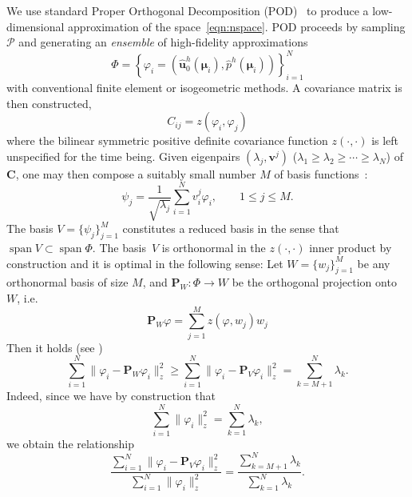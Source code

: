 \documentclass[onecolumn, twoside, a4paper, 11pt]{article}
\begin{document}
We use standard Proper Orthogonal Decomposition (POD)~\cite{Chatterjee2000ipo,Quarteroni2016rbm} to produce
a low-dimensional approximation of the space~\eqref{eqn:nspace}. POD proceeds by sampling $\mathcal{P}$
and generating an \emph{ensemble} of high-fidelity approximations
%
\begin{equation}
\label{eqn:ensemble}
  \Phi = \left\{
    \varphi_i = (\hat{\bm u}^h_0(\bm \mu_i), \hat{p}^h(\bm \mu_i))
  \right\}_{i=1}^N
\end{equation}
%
with conventional finite element or isogeometric methods. A covariance matrix is then
constructed,
\[
  C_{ij} = z(\varphi_i, \varphi_j)
\]
where the bilinear symmetric positive definite covariance function
$z(\cdot,\cdot)$ is left unspecified for the time being. Given eigenpairs
$(\lambda_j, \bm v^j)$ ($\lambda_1\geq\lambda_2\geq\cdots\geq\lambda_N$)
of $\bm C$, one may then compose a suitably small number $M$
of basis functions~\cite[(6.10)]{Quarteroni2016rbm}:
%
\begin{equation}
  \label{eqn:spd}
  \psi_j = \frac{1}{\sqrt{\lambda_j}} \sum_{i=1}^N v^j_i \varphi_i,
  \qquad 1 \leq j \leq M.
\end{equation}
%
The basis $V=\{\psi_j\}_{j=1}^M$ constitutes a reduced basis in the sense
that $\operatorname{span}V\subset\operatorname{span}\Phi$. The basis~$V$ is orthonormal
in the $z(\cdot,\cdot)$ inner product by construction and it
is optimal in the following sense: Let
$W =\{ w_j\}_{j=1}^M$ be any orthonormal basis of size $M$, and
$\bm P_W:\Phi\to{}W$ be the orthogonal projection onto $W$, i.e.
%
\begin{equation}
  \bm P_W \varphi = \sum_{j=1}^M z(\varphi, w_j) w_j
\end{equation}
Then it holds (see \cite[Proposition 6.2]{Quarteroni2016rbm})
\begin{equation}
  \sum_{i=1}^N \| \varphi_i - \bm P_W \varphi_i \|_z^2 \geq
  \sum_{i=1}^N \| \varphi_i - \bm P_V \varphi_i \|_z^2 =
  \sum_{k=M+1}^N \lambda_k.
\end{equation}
Indeed, since we have by construction that
\begin{equation}
  \sum_{i=1}^N \| \varphi_i \|_z^2 = \sum_{k=1}^N \lambda_k,
\end{equation}
%
we obtain the relationship
%
\begin{equation}
  \frac{ \sum_{i=1}^N \| \varphi_i - \bm P_V \varphi_i \|_z^2 }{ \sum_{i=1}^N \| \varphi_i \|_z^2 }
  = \frac{ \sum_{k=M+1}^N \lambda_k }{ \sum_{k=1}^N \lambda_k }.
\end{equation}
\end{document}
